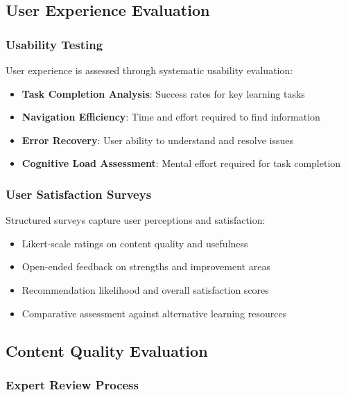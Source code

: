 \subsection{User Experience Evaluation}

\subsubsection{Usability Testing}

User experience is assessed through systematic usability evaluation:

\begin{itemize}
    \item \textbf{Task Completion Analysis}: Success rates for key learning tasks
    \item \textbf{Navigation Efficiency}: Time and effort required to find information
    \item \textbf{Error Recovery}: User ability to understand and resolve issues
    \item \textbf{Cognitive Load Assessment}: Mental effort required for task completion
\end{itemize}

\subsubsection{User Satisfaction Surveys}

Structured surveys capture user perceptions and satisfaction:

\begin{itemize}
    \item Likert-scale ratings on content quality and usefulness
    \item Open-ended feedback on strengths and improvement areas
    \item Recommendation likelihood and overall satisfaction scores
    \item Comparative assessment against alternative learning resources
\end{itemize}

\subsection{Content Quality Evaluation}

\subsubsection{Expert Review Process}

